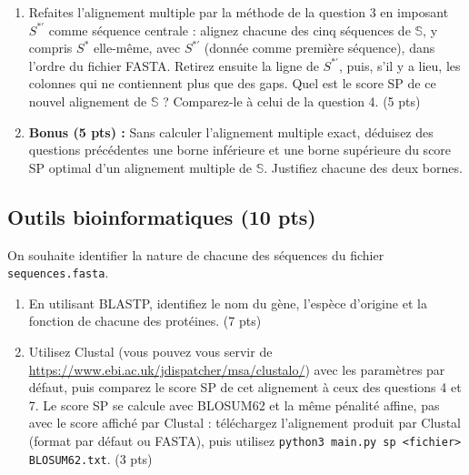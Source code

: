 \documentclass[12pt]{article}
\begin{document}
\begin{enumerate}
	      Créez d'abord une copie $S^{*\prime}$ de $S^*$ ($S^*$ elle-même reste inchangée et fait toujours partie de $\mathbb{S}$). Ensuite, dans l'alignement obtenu à la question 3, pour chaque colonne où $S^*$ porte un acide aminé, remplacez l'acide aminé correspondant de $S^{*\prime}$ par celui ($x$), parmi les 20 acides aminés standards, qui maximise $\sum_{c} \mathrm{BLOSUM62}(x, c)$, où $c$ parcourt les acides aminés de la colonne (y compris celui de $S^*$, gaps ignorés). En cas d'égalité, prenez la plus petite lettre dans l'ordre alphabétique. Les colonnes où $S^*$ a un gap sont ignorées, donc $|S^{*\prime}| = |S^*|$. Combien d'acides aminés ont changé entre $S^*$ et $S^{*\prime}$ ? (5 pts)
	\item Refaites l'alignement multiple par la méthode de la question 3 en imposant $S^{*\prime}$ comme séquence centrale : alignez chacune des cinq séquences de $\mathbb{S}$, y compris $S^*$ elle-même, avec $S^{*\prime}$ (donnée comme première séquence), dans l'ordre du fichier FASTA. Retirez ensuite la ligne de $S^{*\prime}$, puis, s'il y a lieu, les colonnes qui ne contiennent plus que des gaps. Quel est le score SP de ce nouvel alignement de $\mathbb{S}$ ? Comparez-le à celui de la question 4. (5 pts)
	\item \textbf{Bonus (5 pts) :} Sans calculer l'alignement multiple exact, déduisez des questions précédentes une borne inférieure et une borne supérieure du score SP optimal d'un alignement multiple de $\mathbb{S}$. Justifiez chacune des deux bornes.
\end{enumerate}

\subsection*{Outils bioinformatiques (10 pts)}

On souhaite identifier la nature de chacune des séquences du fichier \texttt{sequences.fasta}.
\begin{enumerate}
	\item En utilisant BLASTP, identifiez le nom du gène, l'espèce d'origine et la fonction de chacune des protéines. (7 pts)
	\item Utilisez Clustal (vous pouvez vous servir de \url{https://www.ebi.ac.uk/jdispatcher/msa/clustalo/}) avec les paramètres par défaut, puis comparez le score SP de cet alignement à ceux des questions 4 et 7. Le score SP se calcule avec BLOSUM62 et la même pénalité affine, pas avec le score affiché par Clustal : téléchargez l'alignement produit par Clustal (format par défaut ou FASTA), puis utilisez \texttt{python3 main.py sp <fichier> BLOSUM62.txt}. (3 pts)
\end{enumerate}
\end{document}
